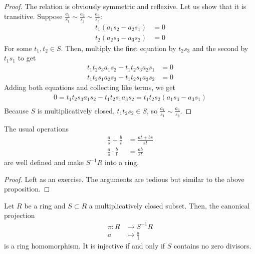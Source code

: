             \begin{proof}
                The relation is obviously symmetric and reflexive.
                Let us show that it is transitive.
                Suppose $\frac{a_1}{s_1} \sim \frac{a_2}{s_2} \sim \frac{a_3}{s_3} $:
                \begin{align}
                    t_1 (a_1 s_2 - a_2 s_1) &= 0 \nonumber \\
                    t_2 (a_2 s_3 - a_3 s_2) &= 0 \nonumber
                \end{align}
                For some $t_1, t_2 \in S$.
                Then, multiply the first equation by $t_2 s_3$ and the second by $t_1 s_1$ to get
                \begin{align}
                    t_1 t_2 s_3 a_1 s_2 - t_1 t_2 s_3 a_2 s_1 &= 0 \nonumber \\
                    t_1 t_2 s_1 a_2 s_3 - t_1 t_2 s_1 a_3 s_2 &= 0 \nonumber
                \end{align}
                Adding both equations and collecting like terms, we get
                \begin{align}
                    0 = t_1 t_2 s_3 a_1 s_2 - t_1 t_2 s_1 a_3 s_2 = t_1 t_2 s_2 (a_1 s_3 - a_3 s_1)  \nonumber \\
                \end{align}
                Because $S$ is multiplicatively closed, $t_1 t_2 s_2 \in S$, so $\frac{a_1}{s_1} \sim \frac{a_3}{s_3}$.

            \end{proof}

        \begin{prop}
            The usual operations
            \begin{align}
                \frac{a}{s} + \frac{b}{t} &= \frac{at + bs}{st} \nonumber \\
                \frac{a}{s} \cdot \frac{b}{t} &= \frac{ab}{st} \nonumber
            \end{align}
            are well defined and make $S^{-1}R$ into a ring.
        \end{prop}
            \begin{proof}
                Left as an exercise.
                The arguments are tedious but similar to the above proposition. %
            \end{proof}

        \begin{prop}
            Let $R$ be a ring and $S \subset R$ a multiplicatively closed subset.
            Then, the canonical projection
                \begin{align}
                \pi: R &\rightarrow S^{-1}R \nonumber \\
                    a &\mapsto \frac{a}{1} \nonumber
                \end{align}
            is a ring homomorphism.
            It is injective if and only if $S$ contains no zero divisors.
        \end{prop}

